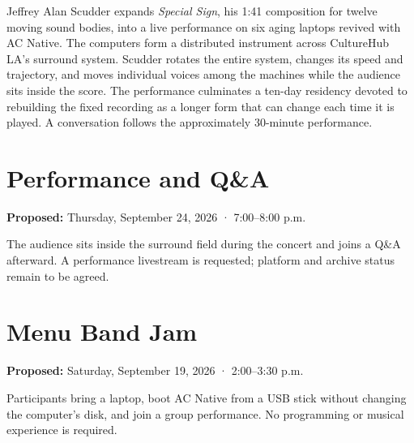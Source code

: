 \documentclass[14pt,letterpaper]{extarticle}
\begin{document}
\workingtitle

\vspace{0.5em}


Jeffrey Alan Scudder expands \emph{Special Sign}, his 1:41 composition for twelve
moving sound bodies, into a live performance on six aging laptops revived with
AC Native. The computers form a distributed instrument across CultureHub LA’s
surround system. Scudder rotates the entire system, changes its speed and
trajectory, and moves individual voices among the machines while the audience
sits inside the score. The performance culminates a ten-day residency devoted
to rebuilding the fixed recording as a longer form that can change each time it
is played. A conversation follows the approximately 30-minute performance.

\clearpage
{}

\section{Performance and Q\&A}
\par
\textbf{Proposed:} Thursday, September 24, 2026 · 7:00–8:00 p.m.

The audience sits inside the surround field during the concert and joins a Q\&A
afterward. A performance livestream is requested; platform and archive status
remain to be agreed.

\section{Menu Band Jam}
\par
\textbf{Proposed:} Saturday, September 19, 2026 · 2:00–3:30 p.m.

Participants bring a laptop, boot AC Native from a USB stick without changing
the computer’s disk, and join a group performance. No programming or musical
experience is required.
\end{document}
